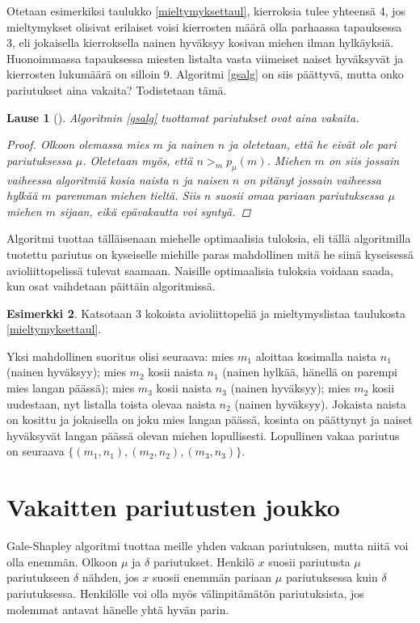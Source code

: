 \documentclass[finnish]{tktltiki2}
\newtheorem{lau}{Lause}
\theoremstyle{definition}
\newtheorem{esim}[lau]{Esimerkki}
\theoremstyle{remark}
\begin{document}
Otetaan esimerkiksi taulukko \ref{mieltymyksettaul}, kierroksia tulee yhteensä 4, jos mieltymykset olisivat erilaiset voisi kierrosten määrä olla parhaassa tapauksessa 3, eli jokaisella kierroksella nainen hyväksyy kosivan miehen ilman hylkäyksiä. Huonoimmassa tapauksessa miesten listalta vasta viimeiset naiset hyväksyvät ja kierrosten lukumäärä on silloin 9.
Algoritmi \ref{gsalg} on siis päättyvä, mutta onko pariutukset aina vakaita?
Todistetaan tämä.
\begin{lau}[\cite{gale62a}]
Algoritmin \ref{gsalg} tuottamat pariutukset ovat aina vakaita.
\begin{proof}
Olkoon olemassa mies $m$ ja nainen $n$ ja oletetaan, että he eivät ole pari pariutuksessa $\mu$. Oletetaan myös, että $n >_{m} p_{\mu}(m)$. Miehen $m$ on siis jossain vaiheessa algoritmiä kosia naista $n$ ja naisen $n$ on pitänyt jossain vaiheessa hylkää $m$ paremman miehen tieltä. Siis $n$ suosii omaa pariaan pariutuksessa $\mu$ miehen $m$ sijaan, eikä epävakautta voi syntyä.
\end{proof}
\end{lau}
Algoritmi tuottaa tälläisenaan miehelle optimaalisia tuloksia, eli tällä algoritmilla tuotettu pariutus on kyseiselle miehille paras mahdollinen mitä he siinä kyseisessä avioliittopelissä tulevat saamaan.
Naisille optimaalisia tuloksia voidaan saada, kun osat vaihdetaan päittäin algoritmissä.

\begin{esim}
	Katsotaan 3 kokoista avioliittopeliä ja mieltymyslistaa taulukosta \ref{mieltymyksettaul}.
	
	Yksi mahdollinen suoritus olisi seuraava: mies $m_1$ aloittaa kosimalla naista $n_1$ (nainen hyväksyy); mies $m_2$ kosii naista $n_1$ (nainen hylkää, hänellä on parempi mies langan päässä); mies $m_3$ kosii naista $n_3$ (nainen hyväksyy); mies $m_2$ kosii uudestaan, nyt listalla toista olevaa naista $n_2$ (nainen hyväksyy). Jokaista naista on kosittu ja jokaisella on joku mies langan päässä, kosinta on päättynyt ja naiset hyväksyvät langan päässä olevan miehen lopullisesti. Lopullinen vakaa pariutus on seuraava $\{(m_1, n_1), (m_2, n_2), (m_3, n_3)\}$.
\end{esim}

\section{Vakaitten pariutusten joukko}
Gale-Shapley algoritmi tuottaa meille yhden vakaan pariutuksen, mutta niitä voi olla enemmän.
Olkoon $\mu$ ja $\delta$ pariutukset. Henkilö $x$ suosii pariutusta $\mu$ pariutukseen $\delta$ nähden, jos $x$ suosii enemmän pariaan $\mu$ pariutuksessa kuin $\delta$ pariutuksessa. Henkilölle voi olla myös välinpitämätön pariutuksista, jos molemmat antavat hänelle yhtä hyvän parin.
\end{document}
